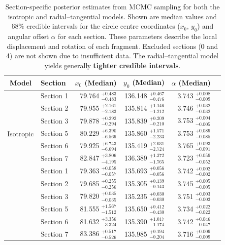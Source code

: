 \documentclass[11pt]{article}
\begin{document}
\begin{table}[ht]
\centering
\caption{Section-specific posterior estimates from MCMC sampling for both the isotropic and radial–tangential models. Shown are median values and 68\% credible intervals for the circle centre coordinates ($x_0$, $y_0$) and angular offset $\alpha$ for each section. These parameters describe the local displacement and rotation of each fragment. Excluded sections (0 and 4) are not shown due to insufficient data. The radial–tangential model yields generally \textbf{tighter credible intervals}.}
\small
\begin{tabular}{clrrrr}
\toprule
Model & Section & \multicolumn{1}{c}{$x_0$ (Median)} & \multicolumn{1}{c}{$y_0$ (Median)} & \multicolumn{1}{c}{$\alpha$ (Median)} \\
\midrule
\multirow{7}{*}{Isotropic}
& Section 1 & 79.764 $^{+0.483}_{-0.483}$ & 136.148 $^{+0.467}_{-0.476}$ & 3.743 $^{+0.008}_{-0.009}$ \\
& Section 2 & 79.955 $^{+2.161}_{-2.183}$ & 135.814 $^{+1.146}_{-1.212}$ & 3.746 $^{+0.032}_{-0.032}$ \\
& Section 3 & 79.878 $^{+0.292}_{-0.294}$ & 135.839 $^{+0.209}_{-0.210}$ & 3.753 $^{+0.004}_{-0.005}$ \\
& Section 5 & 80.229 $^{+6.390}_{-6.569}$ & 135.860 $^{+1.571}_{-2.233}$ & 3.753 $^{+0.089}_{-0.085}$ \\
& Section 6 & 79.925 $^{+6.743}_{-6.694}$ & 135.419 $^{+2.031}_{-2.724}$ & 3.765 $^{+0.093}_{-0.091}$ \\
& Section 7 & 82.847 $^{+3.806}_{-4.195}$ & 136.389 $^{+1.372}_{-1.765}$ & 3.723 $^{+0.059}_{-0.052}$ \\
\midrule
\multirow{7}{*}{Radial-Tangential}
& Section 1 & 79.363 $^{+0.058}_{-0.057}$ & 135.693 $^{+0.056}_{-0.056}$ & 3.742 $^{+0.002}_{-0.002}$ \\
& Section 2 & 79.685 $^{+0.255}_{-0.256}$ & 135.305 $^{+0.139}_{-0.143}$ & 3.745 $^{+0.005}_{-0.005}$ \\
& Section 3 & 79.820 $^{+0.035}_{-0.035}$ & 135.235 $^{+0.030}_{-0.030}$ & 3.751 $^{+0.003}_{-0.003}$ \\
& Section 5 & 81.555 $^{+1.567}_{-1.512}$ & 135.650 $^{+0.412}_{-0.430}$ & 3.734 $^{+0.022}_{-0.022}$ \\
& Section 6 & 81.632 $^{+3.356}_{-3.324}$ & 135.390 $^{+1.017}_{-1.174}$ & 3.742 $^{+0.046}_{-0.047}$ \\
& Section 7 & 83.386 $^{+0.517}_{-0.526}$ & 135.985 $^{+0.194}_{-0.204}$ & 3.716 $^{+0.009}_{-0.009}$ \\
\bottomrule
\end{tabular}
\label{tab:mcmc-2}
\end{table}
\end{document}
